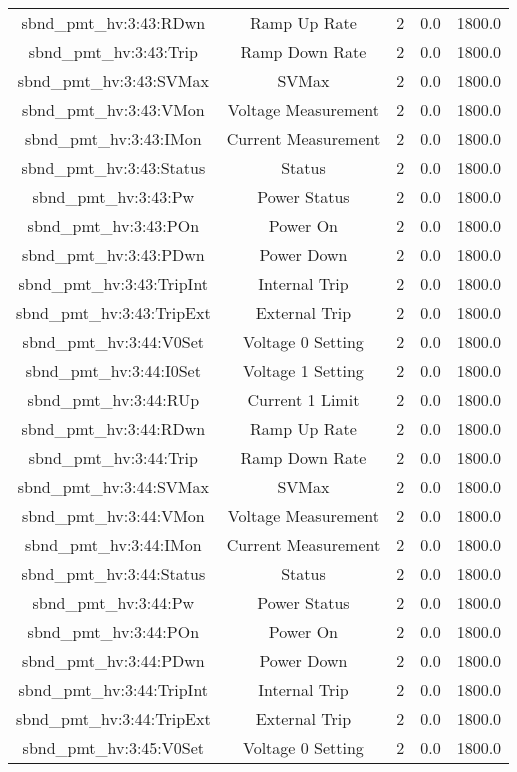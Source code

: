 \begin{table}[ptb]
\begin{tabular}{c | c c c c}
sbnd_pmt_hv:3:43:RDwn & Ramp Up Rate & 2 & 0.0 & 1800.0\\ 
sbnd_pmt_hv:3:43:Trip & Ramp Down Rate & 2 & 0.0 & 1800.0\\ 
sbnd_pmt_hv:3:43:SVMax & SVMax & 2 & 0.0 & 1800.0\\ 
sbnd_pmt_hv:3:43:VMon & Voltage Measurement & 2 & 0.0 & 1800.0\\ 
sbnd_pmt_hv:3:43:IMon & Current Measurement & 2 & 0.0 & 1800.0\\ 
sbnd_pmt_hv:3:43:Status & Status & 2 & 0.0 & 1800.0\\ 
sbnd_pmt_hv:3:43:Pw & Power Status & 2 & 0.0 & 1800.0\\ 
sbnd_pmt_hv:3:43:POn & Power On & 2 & 0.0 & 1800.0\\ 
sbnd_pmt_hv:3:43:PDwn & Power Down & 2 & 0.0 & 1800.0\\ 
sbnd_pmt_hv:3:43:TripInt & Internal Trip & 2 & 0.0 & 1800.0\\ 
sbnd_pmt_hv:3:43:TripExt & External Trip & 2 & 0.0 & 1800.0\\ 
sbnd_pmt_hv:3:44:V0Set & Voltage 0 Setting & 2 & 0.0 & 1800.0\\ 
sbnd_pmt_hv:3:44:I0Set & Voltage 1 Setting & 2 & 0.0 & 1800.0\\ 
sbnd_pmt_hv:3:44:RUp & Current 1 Limit & 2 & 0.0 & 1800.0\\ 
sbnd_pmt_hv:3:44:RDwn & Ramp Up Rate & 2 & 0.0 & 1800.0\\ 
sbnd_pmt_hv:3:44:Trip & Ramp Down Rate & 2 & 0.0 & 1800.0\\ 
sbnd_pmt_hv:3:44:SVMax & SVMax & 2 & 0.0 & 1800.0\\ 
sbnd_pmt_hv:3:44:VMon & Voltage Measurement & 2 & 0.0 & 1800.0\\ 
sbnd_pmt_hv:3:44:IMon & Current Measurement & 2 & 0.0 & 1800.0\\ 
sbnd_pmt_hv:3:44:Status & Status & 2 & 0.0 & 1800.0\\ 
sbnd_pmt_hv:3:44:Pw & Power Status & 2 & 0.0 & 1800.0\\ 
sbnd_pmt_hv:3:44:POn & Power On & 2 & 0.0 & 1800.0\\ 
sbnd_pmt_hv:3:44:PDwn & Power Down & 2 & 0.0 & 1800.0\\ 
sbnd_pmt_hv:3:44:TripInt & Internal Trip & 2 & 0.0 & 1800.0\\ 
sbnd_pmt_hv:3:44:TripExt & External Trip & 2 & 0.0 & 1800.0\\ 
sbnd_pmt_hv:3:45:V0Set & Voltage 0 Setting & 2 & 0.0 & 1800.0\\ 

\end{tabular}
\end{table}
